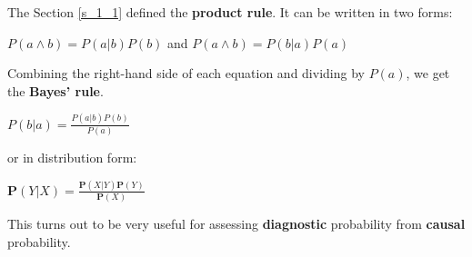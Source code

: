 The Section \ref{s_1_1} defined the \textbf{product rule}. It can be written in two forms:
\begin{center}
    $P(a \wedge b) = P(a|b)P(b)$ and $P(a \wedge b) = P(b|a)P(a)$
\end{center}
Combining the right-hand side of each equation and dividing by $P(a)$, we get the \textbf{Bayes' rule}.
\begin{definition}[title={Bayes' theorem}]
    \begin{center}
        $P(b|a) = \frac{P(a|b)P(b)}{P(a)}$ 
    \end{center} \vspace{3.5pt}
    or in distribution form:
    \begin{center}
        $\mathbf{P}(Y|X) = \frac{\mathbf{P}(X|Y)\mathbf{P}(Y)}{\mathbf{P}(X)}$ 
    \end{center}
\end{definition}
This turns out to be very useful for assessing \textbf{diagnostic} probability from \textbf{causal} probability.

